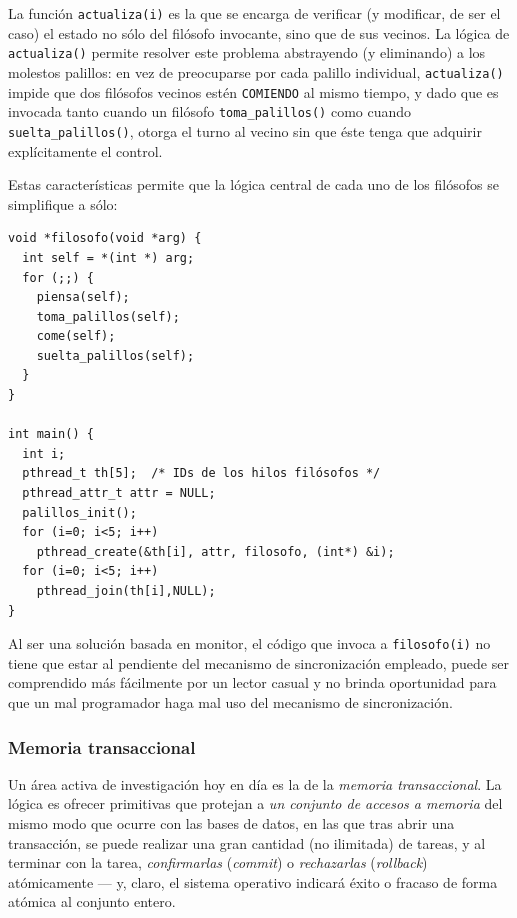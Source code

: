 \documentclass[11pt,fleqn]{book} %
\begin{document}
La función \texttt{actualiza(i)} es la que se encarga de verificar (y
modificar, de ser el caso) el estado no sólo del filósofo invocante,
sino que de sus vecinos. La lógica de \texttt{actualiza()} permite resolver
este problema abstrayendo (y eliminando) a los molestos palillos: en
vez de preocuparse por cada palillo individual, \texttt{actualiza()} impide
que dos filósofos vecinos estén \texttt{COMIENDO} al mismo tiempo, y dado que
es invocada tanto cuando un filósofo \texttt{toma\_palillos()} como cuando
\texttt{suelta\_palillos()}, otorga el turno al vecino sin que éste tenga que
adquirir explícitamente el control.

Estas características permite que la lógica central de cada uno
de los filósofos se simplifique a sólo:


\begin{verbatim}
void *filosofo(void *arg) {
  int self = *(int *) arg;
  for (;;) {
    piensa(self);
    toma_palillos(self);
    come(self);
    suelta_palillos(self);
  }
}

int main() {
  int i;
  pthread_t th[5];  /* IDs de los hilos filósofos */
  pthread_attr_t attr = NULL;
  palillos_init();
  for (i=0; i<5; i++) 
    pthread_create(&th[i], attr, filosofo, (int*) &i);
  for (i=0; i<5; i++) 
    pthread_join(th[i],NULL);
}
\end{verbatim}

Al ser una solución basada en monitor, el código que invoca a
\texttt{filosofo(i)} no tiene que estar al pendiente del mecanismo de
sincronización empleado, puede ser comprendido más fácilmente por un
lector casual y no brinda oportunidad para que un mal programador
haga mal uso del mecanismo de sincronización.
\subsubsection{Memoria transaccional}
\label{sec-3-3-9-2}

      Un área activa de investigación hoy en día es la de la \emph{memoria       transaccional}. La lógica es ofrecer primitivas que protejan a
      \emph{un conjunto de accesos a memoria} del mismo modo que ocurre con
      las bases de datos, en las que tras abrir una transacción, se puede
      realizar una gran cantidad (no ilimitada) de tareas, y al
      terminar con la tarea, \emph{confirmarlas} (\emph{commit}) o \emph{rechazarlas}
      (\emph{rollback}) atómicamente — y, claro, el sistema operativo
      indicará éxito o fracaso de forma atómica al conjunto entero.
\end{document}

